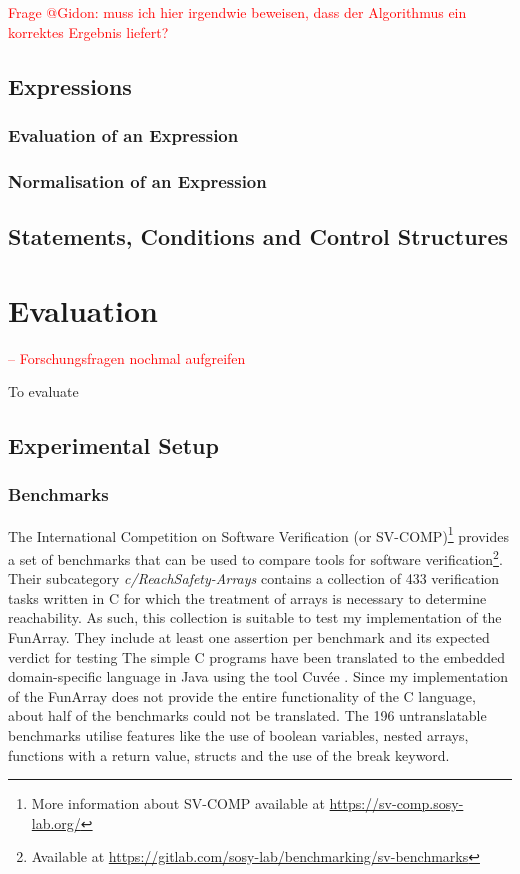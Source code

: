 \documentclass{report}
\begin{document}
\textcolor{red}{Frage @Gidon: muss ich hier irgendwie beweisen, dass der Algorithmus ein korrektes Ergebnis liefert?}

\section{Expressions}
\subsection{Evaluation of an Expression}\label{sec:expressions:evaluation}
\subsection{Normalisation of an Expression}\label{sec:expressions:normalisation}

\section{Statements, Conditions and Control Structures}\label{sec:statementsconditions}


\chapter{Evaluation}
\textcolor{red}{-- Forschungsfragen nochmal aufgreifen}

To evaluate 

\section{Experimental Setup}
\subsection{Benchmarks}

The International Competition on Software Verification (or SV-COMP)\footnote{More information about SV-COMP available at \url{https://sv-comp.sosy-lab.org/}} provides a set of benchmarks that can be used to compare tools for software verification\footnote{Available at \url{https://gitlab.com/sosy-lab/benchmarking/sv-benchmarks}}. Their subcategory \textit{c/ReachSafety-Arrays} contains a collection of 433 verification tasks written in C for which the treatment of arrays is necessary to determine reachability. As such, this collection is suitable to test my implementation of the FunArray. They include at least one assertion per benchmark and its expected verdict for testing 
The simple C programs have been translated to the embedded domain-specific language in Java using the tool Cuv\'ee \cite{ernst2020}. Since my implementation of the FunArray does not provide the entire functionality of the C language, about half of the benchmarks could not be translated. The 196 untranslatable benchmarks utilise features like the use of boolean variables, nested arrays, functions with a return value, structs and the use of the break keyword.
\end{document}
